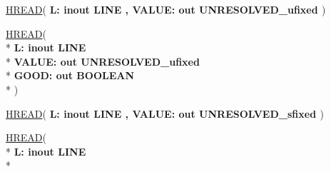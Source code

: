 \begin{DoxyCompactItemize}
\item 
{\bfseries {\bfseries \textcolor{vhdlchar}{ }}} \hyperlink{class__fixed__pkg_a32e9f65860805423413af60fab3bddee}{H\+R\+E\+A\+D}( {\bfseries \textcolor{vhdlchar}{ }\textcolor{vhdlchar}{L\+: }\textcolor{stringliteral}{} {\bfseries \textcolor{keywordflow}{inout}\textcolor{vhdlchar}{ }\textcolor{vhdlchar}{L\+I\+N\+E}\textcolor{vhdlchar}{ }}}{\bfseries ,\textcolor{vhdlchar}{ }\textcolor{vhdlchar}{V\+A\+L\+U\+E\+: }\textcolor{stringliteral}{} {\bfseries \textcolor{keywordflow}{out}\textcolor{vhdlchar}{ }\textcolor{vhdlchar}{U\+N\+R\+E\+S\+O\+L\+V\+E\+D\+\_\+ufixed}\textcolor{vhdlchar}{ }}} )
\item 
{\bfseries {\bfseries \textcolor{vhdlchar}{ }}} \hyperlink{class__fixed__pkg_abd2fa8e7226ac69f2ec1646ed64652af}{H\+R\+E\+A\+D}( \\*
{\bfseries \textcolor{vhdlchar}{ }\textcolor{vhdlchar}{L\+: }\textcolor{stringliteral}{} {\bfseries \textcolor{keywordflow}{inout}\textcolor{vhdlchar}{ }\textcolor{vhdlchar}{L\+I\+N\+E}\textcolor{vhdlchar}{ }}}\\*
  {\bfseries \textcolor{vhdlchar}{ }\textcolor{vhdlchar}{V\+A\+L\+U\+E\+: }\textcolor{stringliteral}{} {\bfseries \textcolor{keywordflow}{out}\textcolor{vhdlchar}{ }\textcolor{vhdlchar}{U\+N\+R\+E\+S\+O\+L\+V\+E\+D\+\_\+ufixed}\textcolor{vhdlchar}{ }}}\\*
  {\bfseries \textcolor{vhdlchar}{ }\textcolor{vhdlchar}{G\+O\+O\+D\+: }\textcolor{stringliteral}{} {\bfseries \textcolor{keywordflow}{out}\textcolor{vhdlchar}{ }\textcolor{comment}{B\+O\+O\+L\+E\+A\+N}\textcolor{vhdlchar}{ }}}\\*
   )
\item 
{\bfseries {\bfseries \textcolor{vhdlchar}{ }}} \hyperlink{class__fixed__pkg_a32e9f65860805423413af60fab3bddee}{H\+R\+E\+A\+D}( {\bfseries \textcolor{vhdlchar}{ }\textcolor{vhdlchar}{L\+: }\textcolor{stringliteral}{} {\bfseries \textcolor{keywordflow}{inout}\textcolor{vhdlchar}{ }\textcolor{vhdlchar}{L\+I\+N\+E}\textcolor{vhdlchar}{ }}}{\bfseries ,\textcolor{vhdlchar}{ }\textcolor{vhdlchar}{V\+A\+L\+U\+E\+: }\textcolor{stringliteral}{} {\bfseries \textcolor{keywordflow}{out}\textcolor{vhdlchar}{ }\textcolor{vhdlchar}{U\+N\+R\+E\+S\+O\+L\+V\+E\+D\+\_\+sfixed}\textcolor{vhdlchar}{ }}} )
\item 
{\bfseries {\bfseries \textcolor{vhdlchar}{ }}} \hyperlink{class__fixed__pkg_abd2fa8e7226ac69f2ec1646ed64652af}{H\+R\+E\+A\+D}( \\*
{\bfseries \textcolor{vhdlchar}{ }\textcolor{vhdlchar}{L\+: }\textcolor{stringliteral}{} {\bfseries \textcolor{keywordflow}{inout}\textcolor{vhdlchar}{ }\textcolor{vhdlchar}{L\+I\+N\+E}\textcolor{vhdlchar}{ }}}\\*

\end{DoxyCompactItemize}
